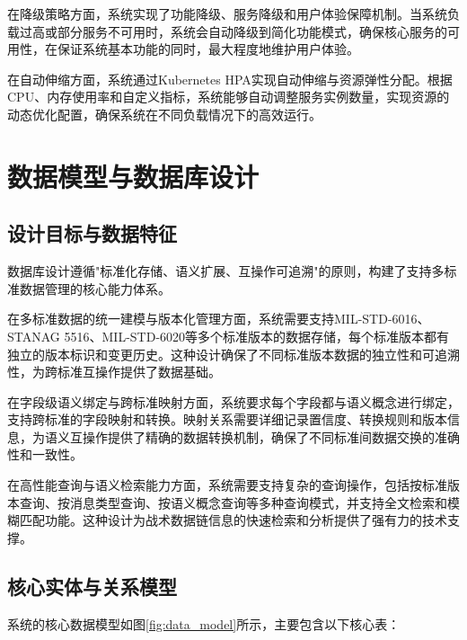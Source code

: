 在降级策略方面，系统实现了功能降级、服务降级和用户体验保障机制。当系统负载过高或部分服务不可用时，系统会自动降级到简化功能模式，确保核心服务的可用性，在保证系统基本功能的同时，最大程度地维护用户体验。

在自动伸缩方面，系统通过Kubernetes HPA实现自动伸缩与资源弹性分配。根据CPU、内存使用率和自定义指标，系统能够自动调整服务实例数量，实现资源的动态优化配置，确保系统在不同负载情况下的高效运行。

\section{数据模型与数据库设计}

\subsection{设计目标与数据特征}

数据库设计遵循"标准化存储、语义扩展、互操作可追溯"的原则，构建了支持多标准数据管理的核心能力体系。

在多标准数据的统一建模与版本化管理方面，系统需要支持MIL-STD-6016、STANAG 5516、MIL-STD-6020等多个标准版本的数据存储，每个标准版本都有独立的版本标识和变更历史。这种设计确保了不同标准版本数据的独立性和可追溯性，为跨标准互操作提供了数据基础。

在字段级语义绑定与跨标准映射方面，系统要求每个字段都与语义概念进行绑定，支持跨标准的字段映射和转换。映射关系需要详细记录置信度、转换规则和版本信息，为语义互操作提供了精确的数据转换机制，确保了不同标准间数据交换的准确性和一致性。

在高性能查询与语义检索能力方面，系统需要支持复杂的查询操作，包括按标准版本查询、按消息类型查询、按语义概念查询等多种查询模式，并支持全文检索和模糊匹配功能。这种设计为战术数据链信息的快速检索和分析提供了强有力的技术支撑。

\subsection{核心实体与关系模型}

系统的核心数据模型如图\ref{fig:data_model}所示，主要包含以下核心表：

